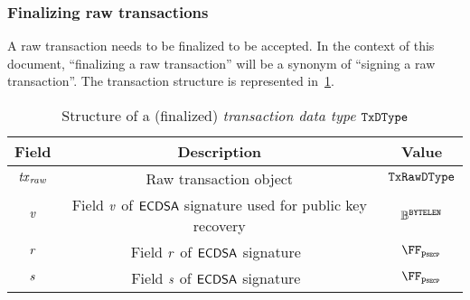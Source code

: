 \subsubsection{Finalizing raw transactions}\label{preliminaries:ethereum:eth-tx:final}
A raw transaction needs to be finalized to be accepted. In the context of this document, ``finalizing a raw transaction'' will be a synonym of ``signing a raw transaction''. The transaction structure is represented in~\cref{preliminaries:tab:eth-signed}.

\begin{table}[H]
    \centering
    \begin{tabular}{ccc}
        Field           & Description & Value \\ \toprule
        $\mathit{\mathit{tx}_{raw}}$      & Raw transaction object & ${\mathtt{TxRawDType}}$ \\ \midrule
        $\mathit{v}$         & Field $\mathit{v}$ of $\mathsf{ECDSA}$ signature used for public key recovery & $\mathbb{B}^{\mathtt{BYTELEN}}$\\ \midrule
        $\mathit{r}$         & Field $\mathit{r}$ of $\mathsf{ECDSA}$ signature~\cite{rfc6979} & $\FFx{\pSecp}$\\ \midrule
        $\mathit{s}$         & Field $\mathit{s}$ of $\mathsf{ECDSA}$ signature~\cite{rfc6979} & $\FFx{\pSecp}$\\ \bottomrule
    \end{tabular}
    \caption{Structure of a (finalized) \emph{transaction data type} ${\mathtt{TxDType}}$}\label{preliminaries:tab:eth-signed}
\end{table}

